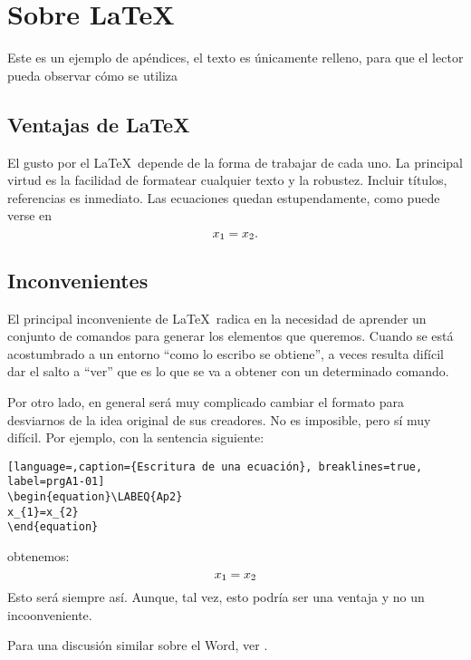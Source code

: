 


\chapter{Sobre  \LaTeX}
{Este es un ejemplo de apéndices, el texto es únicamente relleno, para que el lector pueda observar cómo se utiliza}
\section{Ventajas de \LaTeX}

El gusto por el \LaTeX\ depende de la forma de trabajar de cada uno. La principal virtud es la facilidad de formatear cualquier texto y la robustez. Incluir títulos, referencias es inmediato.
Las ecuaciones quedan estupendamente, como puede verse en 
\begin{equation}\LABEQ{Ap1}
x_{1}=x_{2}.
\end{equation}


\section{Inconvenientes}
El principal inconveniente de \LaTeX\ radica en la necesidad de aprender un conjunto de comandos para generar los elementos que queremos. Cuando se está acostumbrado a un entorno ``como lo escribo se obtiene'', a veces resulta difícil dar el salto a ``ver'' que es lo que se va a obtener con un determinado comando. 

Por otro lado, en general será muy complicado cambiar el formato para desviarnos de la idea original de sus creadores. No es imposible, pero sí muy difícil. Por ejemplo, con la sentencia siguiente:
 
\begin{lstlisting}[language=,caption={Escritura de una ecuación}, breaklines=true, label=prgA1-01]
\begin{equation}\LABEQ{Ap2}
x_{1}=x_{2}
\end{equation}
\end{lstlisting}
obtenemos:
\begin{equation}\LABEQ{Ap2}
x_{1}=x_{2}
\end{equation}
Esto será siempre así. Aunque, tal vez, esto podría ser una ventaja y no un incoonveniente.

Para una discusión similar sobre el Word\tsp{\textregistered}, ver .


